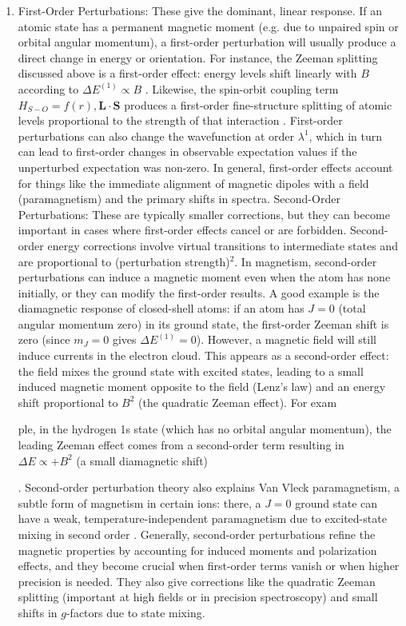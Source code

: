 \documentclass[12pt]{article}
\begin{document}
        \begin{enumerate}
            \item First-Order Perturbations: These give the dominant, linear response. If an atomic state has a permanent magnetic moment (e.g. due to unpaired spin or orbital angular momentum), a first-order perturbation will usually produce a direct change in energy or orientation. For instance, the Zeeman splitting discussed above is a first-order effect: energy levels shift linearly with $B$ according to $\Delta E^{(1)} \propto B$ \cite{Zeeman}. Likewise, the spin-orbit coupling term $H_{S-O} = f(r),\mathbf{L}\cdot\mathbf{S}$ produces a first-order fine-structure splitting of atomic levels proportional to the strength of that interaction \cite{PerturbationTheory}. First-order perturbations can also change the wavefunction at order $\lambda^1$, which in turn can lead to first-order changes in observable expectation values if the unperturbed expectation was non-zero. In general, first-order effects account for things like the immediate alignment of magnetic dipoles with a field (paramagnetism) and the primary shifts in spectra.
            Second-Order Perturbations: These are typically smaller corrections, but they can become important in cases where first-order effects cancel or are forbidden. Second-order energy corrections involve virtual transitions to intermediate states and are proportional to (perturbation strength)$^2$. In magnetism, second-order perturbations can induce a magnetic moment even when the atom has none initially, or they can modify the first-order results. A good example is the diamagnetic response of closed-shell atoms: if an atom has $J=0$ (total angular momentum zero) in its ground state, the first-order Zeeman shift is zero (since $m_J=0$ gives $\Delta E^{(1)}=0$). However, a magnetic field will still induce currents in the electron cloud. This appears as a second-order effect: the field mixes the ground state with excited states, leading to a small induced magnetic moment opposite to the field (Lenz’s law) and an energy shift proportional to $B^2$ (the quadratic Zeeman effect). For exam

ple, in the hydrogen 1s state (which has no orbital angular momentum), the leading Zeeman effect comes from a second-order term resulting in $\Delta E \propto +B^2$ (a small diamagnetic shift)

 \cite{QZeeman}. Second-order perturbation theory also explains Van Vleck paramagnetism, a subtle form of magnetism in certain ions: there, a $J=0$ ground state can have a weak, temperature-independent paramagnetism due to excited-state mixing in second order \cite{Magnetism}. Generally, second-order perturbations refine the magnetic properties by accounting for induced moments and polarization effects, and they become crucial when first-order terms vanish or when higher precision is needed. They also give corrections like the quadratic Zeeman splitting (important at high fields or in precision spectroscopy) and small shifts in $g$-factors due to state mixing.
        \end{enumerate}
 
\end{document}
